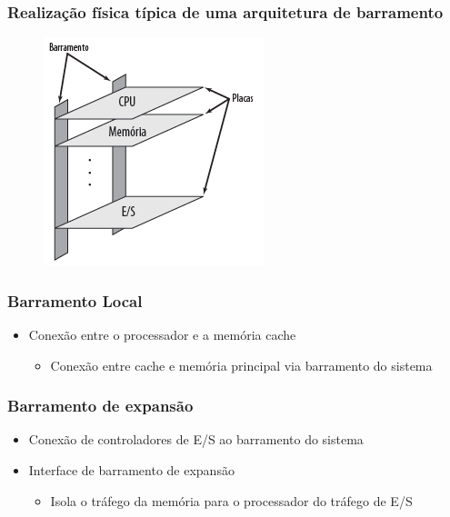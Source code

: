 \documentclass[aspectratio=169,
				xcolor=table]{beamer}
\begin{document}
	\begin{frame}
		\frametitle{Realização física típica de uma arquitetura de barramento}
		\begin{figure}[hbtp]
		\centering
		\includegraphics[height=.75\textheight]{../figs/cap11/baramento1.png}
		\end{figure}
		
	\end{frame}
		
	\begin{frame}
		\frametitle{Barramento Local}
		\begin{itemize}
			\item Conexão entre o processador e a memória cache
			\begin{itemize}
				\item Conexão entre cache e memória principal via barramento do sistema
			\end{itemize}
		\end{itemize}
	\end{frame}
	
	\begin{frame}
		\frametitle{Barramento de expansão}
		\begin{itemize}
			\item Conexão de controladores de E/S ao barramento do sistema
			\vspace{1em}
			\item Interface de barramento de expansão
			\begin{itemize}
				\item Isola o tráfego da memória para o processador do tráfego de E/S
			\end{itemize}
		\end{itemize}
	\end{frame}
	
\end{document}

